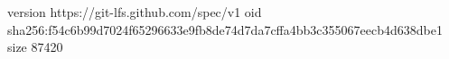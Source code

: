 version https://git-lfs.github.com/spec/v1
oid sha256:f54c6b99d7024f65296633e9fb8de74d7da7cffa4bb3c355067eecb4d638dbe1
size 87420
